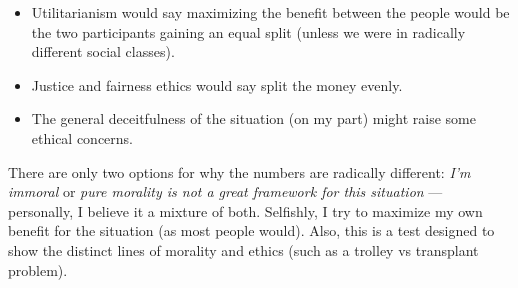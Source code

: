 \documentclass[12pt]{article}
\begin{document}
\begin{itemize}
    \item Utilitarianism would say maximizing the benefit between the people would be the two participants gaining an equal split (unless we were in radically different social classes).
    \item Justice and fairness ethics would say split the money evenly.
    \item The general deceitfulness of the situation (on my part) might raise some ethical concerns.
\end{itemize}

There are only two options for why the numbers are radically different: \textit{I'm immoral} or \textit{pure morality is not a great framework for this situation} --- personally, I believe it a mixture of both. Selfishly, I try to maximize my own benefit for the situation (as most people would). Also, this is a test designed to show the distinct lines of morality and ethics (such as a trolley vs transplant problem).

\end{document}
